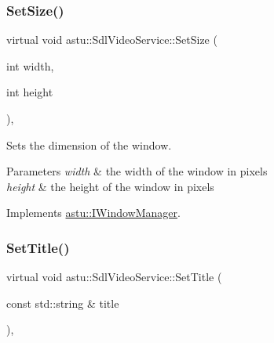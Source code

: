\mbox{\label{classastu_1_1SdlVideoService_a1c8d729ef42024bc0cc5065ecc6631c8}} 
\subsubsection{\texorpdfstring{Set\+Size()}{SetSize()}}
{\footnotesize\ttfamily virtual void astu\+::\+Sdl\+Video\+Service\+::\+Set\+Size (\begin{DoxyParamCaption}\item[{int}]{width,  }\item[{int}]{height }\end{DoxyParamCaption})\hspace{0.3cm}{\ttfamily [override]}, {\ttfamily [virtual]}}

Sets the dimension of the window.


\begin{DoxyParams}{Parameters}
{\em width} & the width of the window in pixels \\
\hline
{\em height} & the height of the window in pixels \\
\hline
\end{DoxyParams}


Implements \hyperlink{classastu_1_1IWindowManager_aca77eeecb7c790fa3c1d58c20dd7294f}{astu\+::\+I\+Window\+Manager}.

\mbox{\label{classastu_1_1SdlVideoService_aad3c873db481dd622d6ddcea70b279af}} 
\subsubsection{\texorpdfstring{Set\+Title()}{SetTitle()}}
{\footnotesize\ttfamily virtual void astu\+::\+Sdl\+Video\+Service\+::\+Set\+Title (\begin{DoxyParamCaption}\item[{const std\+::string \&}]{title }\end{DoxyParamCaption})\hspace{0.3cm}{\ttfamily [override]}, {\ttfamily [virtual]}}

